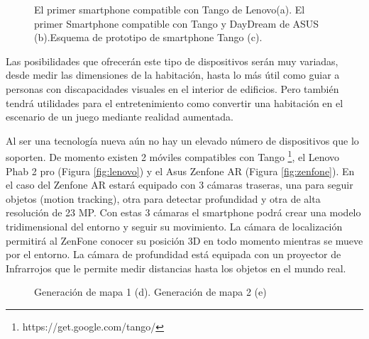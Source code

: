 \begin {enumerate}
\begin{figure}[htbp]
\begin{center}
\hspace{0.5cm}
\end{center}
\caption{El primer smartphone compatible con Tango de Lenovo(a). El primer Smartphone compatible con Tango y DayDream de ASUS (b).Esquema de prototipo de smartphone Tango (c).}
\end{figure}
Las posibilidades que ofrecerán este tipo de dispositivos serán muy variadas, desde medir las dimensiones de la habitación, hasta lo más útil como guiar a personas con discapacidades visuales en el interior de edificios. Pero también tendrá utilidades para el entretenimiento como convertir una habitación en el escenario de un juego mediante realidad aumentada.

Al ser una tecnología nueva aún no hay un elevado número de dispositivos que lo soporten. De momento existen 2 móviles compatibles con Tango \footnote{https://get.google.com/tango/}, el Lenovo  Phab 2 pro (Figura \ref{fig:lenovo}) y el Asus Zenfone AR (Figura \ref{fig:zenfone}).
En el caso del Zenfone AR  estará equipado con 3 cámaras traseras, una para seguir objetos (motion tracking), otra para detectar profundidad y otra de alta resolución de 23 MP.
Con estas 3 cámaras el smartphone podrá crear una modelo tridimensional del entorno y seguir su movimiento. La cámara de localización permitirá al ZenFone conocer su posición 3D en todo momento mientras se mueve por el entorno. La cámara de profundidad está equipada con un proyector de Infrarrojos que le permite medir distancias hasta los objetos en el mundo real.

\begin{figure}[htbp]
\begin{center}
\hspace{0.5cm}
\end{center}
\caption{Generación de mapa 1 (d). Generación de mapa 2 (e)}
\end{figure}


\end{enumerate}
